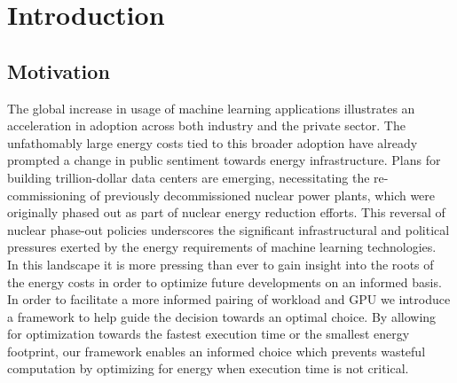 \chapter{Introduction}\label{chap:introduction}

\section{Motivation}

The global increase in usage of machine learning applications
 illustrates an acceleration in adoption across
both industry and the private sector. The unfathomably
large energy costs tied to this broader adoption have
already prompted a change in public sentiment towards
energy infrastructure. Plans for building
trillion-dollar data centers are emerging, necessitating
the re-commissioning of previously decommissioned
nuclear power plants, which were originally phased
out as part of nuclear energy reduction efforts. This
reversal of nuclear phase-out policies underscores the
significant infrastructural and political pressures
exerted by the energy requirements of machine learning
technologies. \\
In this landscape it is more pressing than ever to gain
insight into the roots of the energy costs in order to
optimize future developments on an informed basis. \\
In order to facilitate a more informed pairing of workload 
and GPU we introduce a framework to help guide the decision 
towards an optimal choice. By allowing for optimization towards the fastest execution time or the smallest energy footprint, our framework enables an informed choice which prevents wasteful computation by optimizing for energy when execution time is not critical. 




